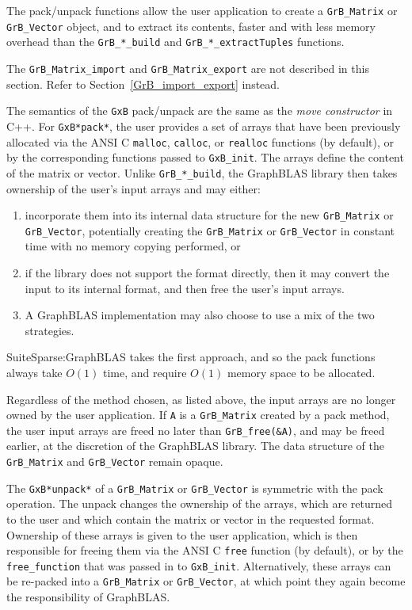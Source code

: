 \documentclass[12pt]{article}
\begin{document}
The pack/unpack functions allow the user application to create a
\verb'GrB_Matrix' or \verb'GrB_Vector' object, and to extract its contents,
faster and with less memory overhead than the \verb'GrB_*_build' and
\verb'GrB_*_extractTuples' functions.

The \verb'GrB_Matrix_import' and \verb'GrB_Matrix_export' are not
described in this section.  Refer to Section~\ref{GrB_import_export} instead.

The semantics of the \verb'GxB' pack/unpack are the same as the
{\em move constructor} in C++.  For \verb'GxB*pack*', the user provides a set of
arrays that have been previously allocated via the ANSI C \verb'malloc',
\verb'calloc', or \verb'realloc' functions (by default), or by the
corresponding functions passed to \verb'GxB_init'.  The arrays define the
content of the matrix or vector.  Unlike \verb'GrB_*_build', the GraphBLAS
library then takes ownership of the user's input arrays and may either:

\begin{enumerate}
\item incorporate them
into its internal data structure for the new \verb'GrB_Matrix' or
\verb'GrB_Vector', potentially creating the \verb'GrB_Matrix' or
\verb'GrB_Vector' in constant time with no memory copying performed, or
\item if
the library does not support the format directly, then it may convert
the input to its internal format, and then free the user's input arrays.
\item A
GraphBLAS implementation may also choose to use a mix of the two strategies.
\end{enumerate}

SuiteSparse:GraphBLAS takes the first approach, and so the pack
functions always take $O(1)$ time, and require $O(1)$ memory space to be
allocated.

Regardless of the method chosen, as listed above, the input arrays are no
longer owned by the user application.  If \verb'A' is a \verb'GrB_Matrix'
created by a pack method, the user input arrays are freed no later than
\verb'GrB_free(&A)', and may be freed earlier, at the discretion of the
GraphBLAS library.  The data structure of the \verb'GrB_Matrix' and
\verb'GrB_Vector' remain opaque.

The \verb'GxB*unpack*' of a \verb'GrB_Matrix' or \verb'GrB_Vector' is symmetric with the
pack operation.  The unpack changes the ownership of the arrays, which are
returned to the user and which contain the
matrix or vector in the requested format.  Ownership of these arrays is given
to the user application, which is then responsible for freeing them via the
ANSI C \verb'free' function (by default), or by the \verb'free_function' that
was passed in to \verb'GxB_init'.  Alternatively, these arrays can be
re-packed into a \verb'GrB_Matrix' or \verb'GrB_Vector', at which point they
again become the responsibility of GraphBLAS.
\end{document}

